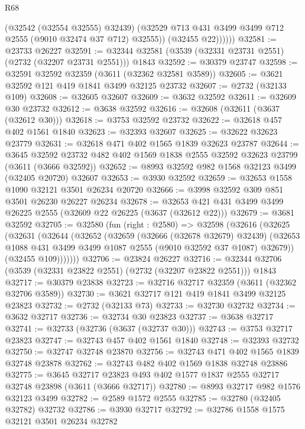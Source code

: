 \begin{lexlean}{R68}
\begin{coremodule}
                (@32542 (@32554 @32555) @32439)
                (@32529 @713 @431 @3499 @3499 @712 @2555 (@9010 @32474 @37 @712) @32555))
              (@32455 @22))))))
@32581 := @23733 @26227
@32591 := @32344 @32581 (@3539 (@32331 @23731 @2551) (@2732 (@32207 @23731 @2551))) @1843
@32592 := @30379 @23747
@32598 := @32591 @32592 @32359 (@3611 (@32362 @32581 @3589))
@32605 := @3621 @32592 @121 @419 @1841 @3499 @32125 @23732
@32607 := @2732 (@32133 @109)
@32608 := @32605 @32607
@32609 := @3632 @32592
@32611 := @32609 @30 @23732
@32612 := @3638 @32592
@32616 := @32608 (@32611 (@3637 (@32612 @30)))
@32618 := @3753 @32592 @23732
@32622 := @32618 @457 @402 @1561 @1840
@32623 := @32393 @32607
@32625 := @32622 @32623 @23779
@32631 := @32618 @471 @402 @1565 @1839 @32623 @23787
@32644 := @3645
    @32592
    @23732
    @482
    @402
    @1569
    @1838
    @2555
    @32592
    @32623
    @23799
    (@3611 (@3666 @32592))
@32652 := @8993 @32592 @982 @1568 @32123 @3499 (@32405 @20720) @32607
@32653 := @3930 @32592
@32659 := @32653 @1558 @1090 @32121 @3501 @26234 @20720
@32666 := @3998 @32592 @309 @851 @3501 @26230 @26227 @26234
@32678 := @32653 @421 @431 @3499 @3499 @26225 @2555 (@32609 @22 @26225 (@3637 (@32612 @22)))
@32679 := @3681 @32592
@32705 := @32580
    (fun (right : @2580) =>
    @32598
      (@32616
        (@32625
          (@32631
            (@32644
              (@32652
                (@32659
                  (@32666 (@32678 @32679) @32439)
                  (@32653 @1088 @431 @3499 @3499 @1087 @2555 (@9010 @32592 @37 @1087) @32679))
                (@32455 @109)))))))
@32706 := @23824 @26227
@32716 := @32344 @32706 (@3539 (@32331 @23822 @2551) (@2732 (@32207 @23822 @2551))) @1843
@32717 := @30379 @23838
@32723 := @32716 @32717 @32359 (@3611 (@32362 @32706 @3589))
@32730 := @3621 @32717 @121 @419 @1841 @3499 @32125 @23823
@32732 := @2732 (@32133 @73)
@32733 := @32730 @32732
@32734 := @3632 @32717
@32736 := @32734 @30 @23823
@32737 := @3638 @32717
@32741 := @32733 (@32736 (@3637 (@32737 @30)))
@32743 := @3753 @32717 @23823
@32747 := @32743 @457 @402 @1561 @1840
@32748 := @32393 @32732
@32750 := @32747 @32748 @23870
@32756 := @32743 @471 @402 @1565 @1839 @32748 @23878
@32762 := @32743 @482 @402 @1569 @1838 @32748 @23886
@32775 := @3645
    @32717
    @23823
    @493
    @402
    @1577
    @1837
    @2555
    @32717
    @32748
    @23898
    (@3611 (@3666 @32717))
@32780 := @8993 @32717 @982 @1576 @32123 @3499
@32782 := @2589 @1572 @2555
@32785 := @32780 (@32405 @32782) @32732
@32786 := @3930 @32717
@32792 := @32786 @1558 @1575 @32121 @3501 @26234 @32782

\end{coremodule}
\end{lexlean}
